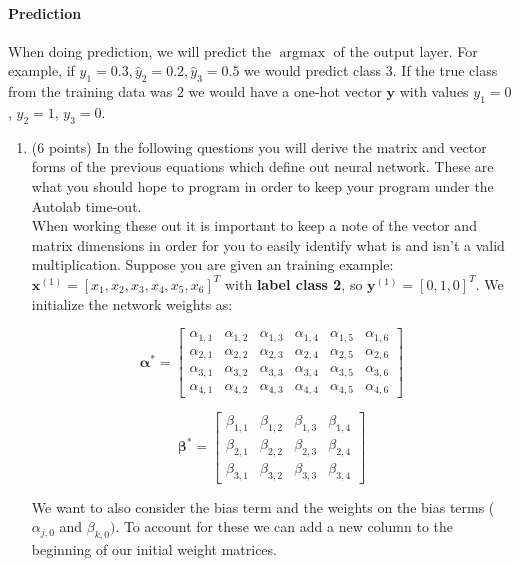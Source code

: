\documentclass[11pt]{exam}
\numberwithin{equation}{section} %
\numberwithin{figure}{section} %
\numberwithin{table}{section} %
\newcommand{\xv}{\mathbf{x}}
\newcommand{\yv}{\mathbf{y}}
\newcommand \argmax {\operatorname*{argmax}}
\begin{document}
\paragraph{Prediction}
When doing prediction, we will predict the $\argmax$ of the output layer. For example, if $\hat{y}_1=0.3, \hat{y}_2=0.2, \hat{y}_3=0.5$ we would predict class 3. If the true class from the training data was $2$ we would have a one-hot vector $\yv$ with values $y_1=0$, $y_2=1$, $y_3=0$.
    
\begin{enumerate}

	\item (6 points) In the following questions you will derive the matrix and vector forms of the previous equations which define out neural network. These are what you should hope to program in order to keep your program under the Autolab time-out.\\
	When working these out it is important to keep a note of the vector and matrix dimensions in order for you to easily identify what is and isn't a valid multiplication. Suppose you are given an training example: $\xv^{(1)}=[x_1,x_2,x_3,x_4,x_5,x_6]^T$ with \textbf{label class 2}, so $\yv^{(1)}=[0,1,0]^T$. We initialize the network weights as:
	\begin{center}
	$$\boldsymbol{\alpha^*}=
	    \begin{bmatrix}
	    \alpha_{1,1} & \alpha_{1,2} & \alpha_{1,3} & \alpha_{1,4} & \alpha_{1,5} & \alpha_{1,6} \\
	    \alpha_{2,1} & \alpha_{2,2} & \alpha_{2,3} & \alpha_{2,4} & \alpha_{2,5} & \alpha_{2,6} \\
	    \alpha_{3,1} & \alpha_{3,2} & \alpha_{3,3} & \alpha_{3,4} & \alpha_{3,5} & \alpha_{3,6} \\
	    \alpha_{4,1} & \alpha_{4,2} & \alpha_{4,3} & \alpha_{4,4} & \alpha_{4,5} & \alpha_{4,6}
	    \end{bmatrix}$$
	    
	$$\boldsymbol{\beta^*}=
	    \begin{bmatrix}
	    \beta_{1,1} & \beta_{1,2} & \beta_{1,3} & \beta_{1,4} \\
	    \beta_{2,1} & \beta_{2,2} & \beta_{2,3} & \beta_{2,4} \\
	    \beta_{3,1} & \beta_{3,2} & \beta_{3,3} & \beta_{3,4}
	    \end{bmatrix}
	$$
	\end{center}
	    
	We want to also consider the bias term and the weights on the bias terms (${\alpha}_{j,0}$ and ${\beta}_{k,0})$. To account for these we can add a new column to the beginning of our initial weight matrices. 
	

\end{enumerate}
\end{document}
